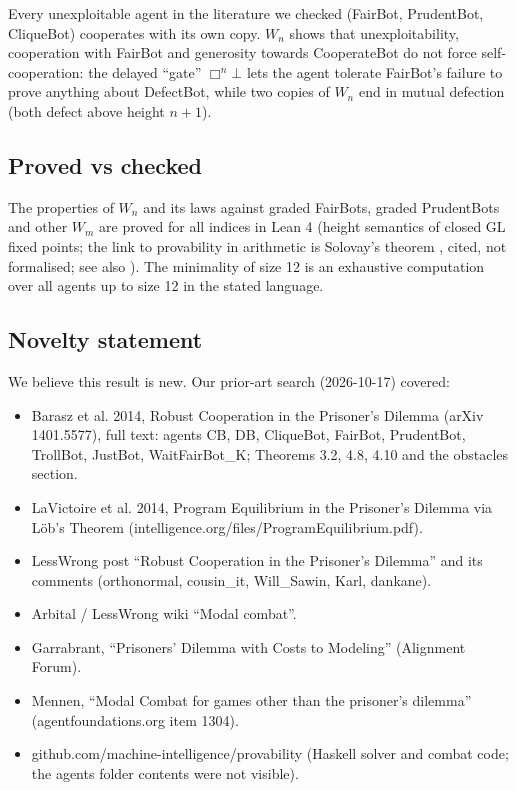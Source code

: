 \documentclass{article}
\begin{document}
Every unexploitable agent in the literature we checked (FairBot, PrudentBot, CliqueBot)
cooperates with its own copy. $W_n$ shows that unexploitability, cooperation with FairBot and
generosity towards CooperateBot do not force self-cooperation: the delayed ``gate''
$\Box^n\bot$ lets the agent tolerate FairBot's failure to prove anything about DefectBot, while
two copies of $W_n$ end in mutual defection (both defect above height $n+1$).

\subsection*{Proved vs checked}

The properties of $W_n$ and its laws against graded FairBots, graded PrudentBots and other
$W_m$ are proved for all indices in Lean 4 (height semantics of closed GL fixed points; the link
to provability in arithmetic is Solovay's theorem \cite{solovay1976provability}, cited, not formalised; see also \cite{boolos1993logic}). The minimality of size
12 is an exhaustive computation over all agents up to size 12 in the stated language.

\subsection*{Novelty statement}

We believe this result is new. Our prior-art search (2026-10-17) covered:

\begin{itemize}
\item Barasz et al. 2014, Robust Cooperation in the Prisoner's Dilemma (arXiv 1401.5577), full text: agents CB, DB, CliqueBot, FairBot, PrudentBot, TrollBot, JustBot, WaitFairBot\_K; Theorems 3.2, 4.8, 4.10 and the obstacles section.
\item LaVictoire et al. 2014, Program Equilibrium in the Prisoner's Dilemma via Löb's Theorem (intelligence.org/files/ProgramEquilibrium.pdf).
\item LessWrong post ``Robust Cooperation in the Prisoner's Dilemma'' and its comments (orthonormal, cousin\_it, Will\_Sawin, Karl, dankane).
\item Arbital / LessWrong wiki ``Modal combat''.
\item Garrabrant, ``Prisoners' Dilemma with Costs to Modeling'' (Alignment Forum).
\item Mennen, ``Modal Combat for games other than the prisoner's dilemma'' (agentfoundations.org item 1304).
\item github.com/machine-intelligence/provability (Haskell solver and combat code; the agents folder contents were not visible).
\end{itemize}
\end{document}
